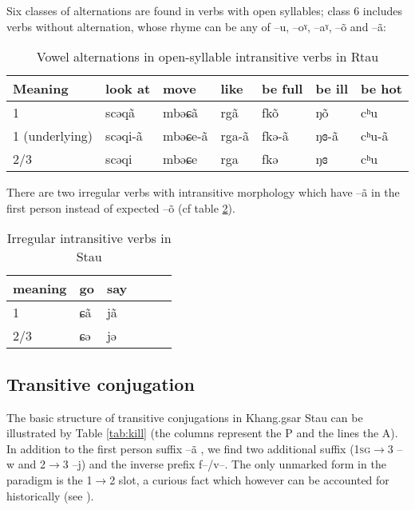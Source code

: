 \documentclass[oneside,a4paper,11pt]{article}
\newcommand{\ipa}[1]{{\phon #1}} %
\begin{document}
Six classes of alternations are found in verbs with open syllables; class 6 includes verbs without alternation, whose rhyme can be any of --\ipa{u}, --\ipa{oˠ}, --\ipa{aˠ}, --\ipa{õ} and --\ipa{ã}:
\begin{table}[H]
\caption{Vowel alternations in open-syllable intransitive verbs in Rtau} \label{tab:open.intr} \centering
\begin{tabular}{llll|ll|l}
\toprule
Meaning &	look at   &  	move   &  	like&  	be full     &  	 	be ill      &  	be hot       \\  
\midrule
1&	\ipa{scəqã} & 	\ipa{mbəɕã} & \ipa{rgã} &	\ipa{fkõ} & 	  	\ipa{ŋõ} & 	   	\ipa{cʰu}   \\ 
1 (underlying)&	\ipa{scəqi-ã} & 	\ipa{mbəɕe-ã} & \ipa{rga-ã} &	\ipa{fkə-ã} & 	  	\ipa{ŋɞ-ã} & 	   	\ipa{cʰu-ã}   \\ 
2/3&	\ipa{scəqi} & 	\ipa{mbəɕe} & \ipa{rga} & 	\ipa{fkə} & 	  	\ipa{ŋɞ} & 	 	\ipa{cʰu}  \\ 
\bottomrule
\end{tabular}
\end{table}


There are two irregular verbs with intransitive morphology  which have \ipa{--ã} in the first person instead of expected \ipa{--õ} (cf table \ref{tab:irr.intr}). 

\begin{table}[H]
\caption{Irregular intransitive verbs in Stau} \label{tab:irr.intr} \centering
\begin{tabular}{llllll}
\toprule
meaning &	go     & say &\\  
\midrule
1&	\ipa{ɕã}  	 &\ipa{jã} &\\ 
2/3&	\ipa{ɕə} & 	\ipa{jə} &\\ 
\bottomrule
\end{tabular}
\end{table}

 \subsection{Transitive conjugation}
The basic structure of transitive conjugations  in Khang.gsar Stau can be illustrated by Table \ref{tab:kill} (the columns represent the P and the lines the A). In addition to the first person suffix \ipa{--ã} , we find two additional suffix (\textsc{1sg}$\rightarrow$3  \ipa{--w} and 2$\rightarrow$3 \ipa{--j}) and the inverse prefix \ipa{f--/v--}. The only unmarked form in the paradigm is the 1$\rightarrow$2 slot, a curious fact which however can be accounted for historically (see \citealt{jacques14rtau}).
\end{document}
